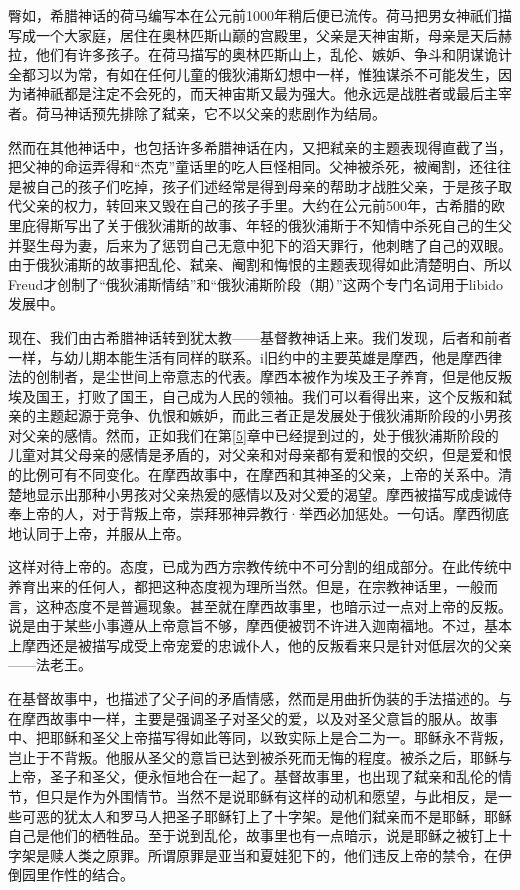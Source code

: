\documentclass[UTF8,10pt,a4paper,openany]{book}
\begin{document}
臀如，希腊神话的荷马编写本在公元前1000年稍后便已流传。荷马把男女神祇们描写成一个大家庭，居住在奥林匹斯山巅的宫殿里，父亲是天神宙斯，母亲是天后赫拉，他们有许多孩子。在荷马描写的奥林匹斯山上，乱伦、嫉妒、争斗和阴谋诡计全都习以为常，有如在任何儿童的俄狄浦斯幻想中一样，惟独谋杀不可能发生，因为诸神祇都是注定不会死的，而天神宙斯又最为强大。他永远是战胜者或最后主宰者。荷马神话预先排除了弑亲，它不以父亲的悲剧作为结局。

然而在其他神话中，也包括许多希腊神话在内，又把弒亲的主题表现得直截了当，把父神的命运弄得和“杰克”童话里的吃人巨怪相同。父神被杀死，被阉割，还往往是被自己的孩子们吃掉，孩子们述经常是得到母亲的帮助才战胜父亲，于是孩子取代父亲的权力，转回来又毁在自己的孩子手里。大约在公元前500年，古希腊的欧里庇得斯写出了关于俄狄浦斯的故事、年轻的俄狄浦斯于不知情中杀死自己的生父并娶生母为妻，后来为了惩罚自己无意中犯下的滔天罪行，他刺瞎了自己的双眼。由于俄狄浦斯的故事把乱伦、弑亲、阉割和悔恨的主题表现得如此清楚明白、所以Freud才创制了“俄狄浦斯情结”和“俄狄浦斯阶段（期）”这两个专门名词用于libido发展中。

现在、我们由古希腊神话转到犹太教——基督教神话上来。我们发现，后者和前者一样，与幼儿期本能生活有同样的联系。i旧约中的主要英雄是摩西，他是摩西律法的创制者，是尘世间上帝意志的代表。摩西本被作为埃及王子养育，但是他反叛埃及国王，打败了国王，自己成为人民的领袖。我们可以看得出来，这个反叛和弑亲的主题起源于竞争、仇恨和嫉妒，而此三者正是发展处于俄狄浦斯阶段的小男孩对父亲的感情。然而，正如我们在第\ref{5}章中已经提到过的，处于俄狄浦斯阶段的儿童对其父母亲的感情是矛盾的，对父亲和对母亲都有爱和恨的交织，但是爱和恨的比例可有不同变化。在摩西故事中，在摩西和其神圣的父亲，上帝的关系中。清楚地显示出那种小男孩对父亲热爰的感情以及对父爱的渴望。摩西被描写成虔诚侍奉上帝的人，对于背叛上帝，崇拜邪神异教行·举西必加惩处。一句话。摩西彻底地认同于上帝，并服从上帝。

这样对待上帝的。态度，已成为西方宗教传统中不可分割的组成部分。在此传统中养育出来的任何人，都把这种态度视为理所当然。但是，在宗教神话里，一般而言，这种态度不是普遍现象。甚至就在摩西故事里，也暗示过一点对上帝的反叛。说是由于某些小事遵从上帝意旨不够，摩西便被罚不许进入迦南福地。不过，基本上摩西还是被描写成受上帝宠爱的忠诚仆人，他的反叛看来只是针对低层次的父亲——法老王。

在基督故事中，也描述了父子间的矛盾情感，然而是用曲折伪装的手法描述的。与在摩西故事中一样，主要是强调圣子对圣父的爱，以及对圣父意旨的服从。故事中、把耶稣和圣父上帝描写得如此等同，以致实际上是合二为一。耶稣永不背叛，岂止于不背叛。他服从圣父的意旨已达到被杀死而无悔的程度。被杀之后，耶稣与上帝，圣子和圣父，便永恒地合在一起了。基督故事里，也出现了弑亲和乱伦的情节，但只是作为外围情节。当然不是说耶稣有这样的动机和愿望，与此相反，是一些可恶的犹太人和罗马人把圣子耶稣钉上了十字架。是他们弑亲而不是耶稣，耶稣自己是他们的栖牲品。至于说到乱伦，故事里也有一点暗示，说是耶稣之被钉上十字架是赎人类之原罪。所谓原罪是亚当和夏娃犯下的，他们违反上帝的禁令，在伊倒园里作性的结合。
\end{document}
